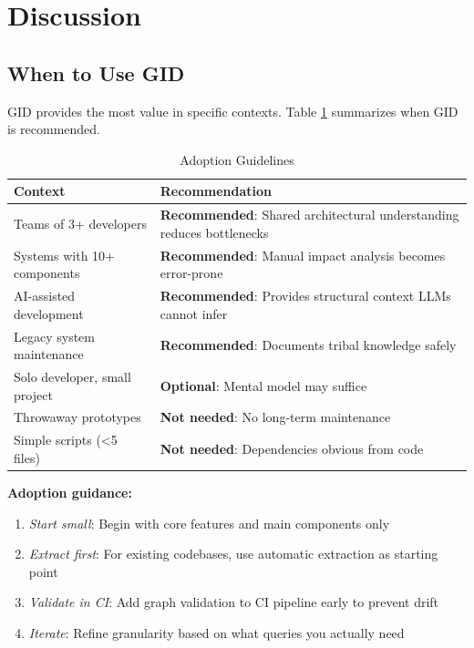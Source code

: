 \documentclass[11pt,a4paper]{article}
\begin{document}
\section{Discussion}

\subsection{When to Use GID}

GID provides the most value in specific contexts. Table \ref{tab:adoption} summarizes when GID is recommended.

\begin{table}[h]
\centering
\caption{Adoption Guidelines}
\label{tab:adoption}
\begin{tabular}{@{}lp{7cm}@{}}
\toprule
\textbf{Context} & \textbf{Recommendation} \\
\midrule
Teams of 3+ developers & \textbf{Recommended}: Shared architectural understanding reduces bottlenecks \\
Systems with 10+ components & \textbf{Recommended}: Manual impact analysis becomes error-prone \\
AI-assisted development & \textbf{Recommended}: Provides structural context LLMs cannot infer \\
Legacy system maintenance & \textbf{Recommended}: Documents tribal knowledge safely \\
\midrule
Solo developer, small project & \textbf{Optional}: Mental model may suffice \\
Throwaway prototypes & \textbf{Not needed}: No long-term maintenance \\
Simple scripts (<5 files) & \textbf{Not needed}: Dependencies obvious from code \\
\bottomrule
\end{tabular}
\end{table}

\textbf{Adoption guidance:}
\begin{enumerate}[noitemsep]
    \item \emph{Start small}: Begin with core features and main components only
    \item \emph{Extract first}: For existing codebases, use automatic extraction as starting point
    \item \emph{Validate in CI}: Add graph validation to CI pipeline early to prevent drift
    \item \emph{Iterate}: Refine granularity based on what queries you actually need
\end{enumerate}
\end{document}
